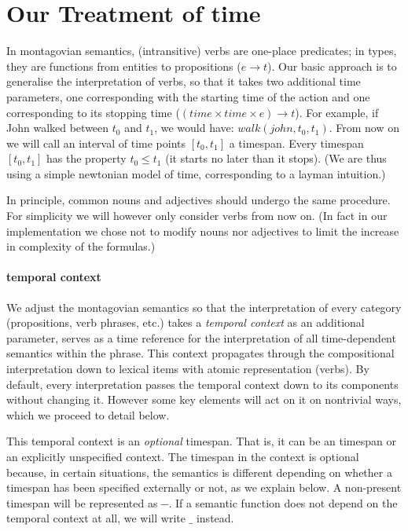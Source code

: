 \documentclass[a4paper,11pt]{article}
\begin{document}
\section{Our Treatment of time}

In montagovian semantics, (intransitive) verbs are one-place
predicates; in types, they are functions from entities to propositions
($e \to t$).  Our basic approach is to generalise the interpretation of 
verbs, so that it takes two
additional time parameters, one corresponding with the starting time
of the action and one corresponding to its stopping time ($(time × time × e) \to t$). For example,
if John walked between $t_0$ and $t_1$, we would have:
$walk(john,t_0,t_1)$. From now on we will call an interval of time
points $[t_0,t_1]$ a timespan. Every timespan $[t_0,t_1]$ has the
property $t_0 ≤ t_1$ (it starts no later than it stops). (We are thus
using a simple newtonian model of time, corresponding to a layman
intuition.)

In principle, common nouns and adjectives should undergo the same
procedure. For simplicity we will however only consider verbs from now
on. (In fact in our implementation we chose not to modify nouns nor
adjectives to limit the increase in complexity of the formulas.)

\paragraph{temporal context}

We adjust the montagovian semantics so that the interpretation of
every category (propositions, verb phrases, etc.) takes a
\emph{temporal context} as an additional parameter, serves as a time
reference for the interpretation of all time-dependent semantics
within the phrase.  This context propagates through the compositional
interpretation down to lexical items with atomic representation
(verbs). By default, every interpretation passes the temporal context
down to its components without changing it. However some key elements
will act on it on nontrivial ways, which we proceed to detail below.

This temporal context is an \emph{optional} timespan. That is, it can
be an timespan or an explicitly unspecified context.
\newcommand\nospan{\ensuremath{─}}
\newcommand\anyspan{\ensuremath{\_}} The timespan in the context is
optional because, in certain situations, the semantics is different
depending on whether a timespan has been specified externally or not,
as we explain below. A non-present timespan will be represented as
\nospan{}. If a semantic function does not depend on the temporal
context at all, we will write \anyspan{} instead.
\end{document}
